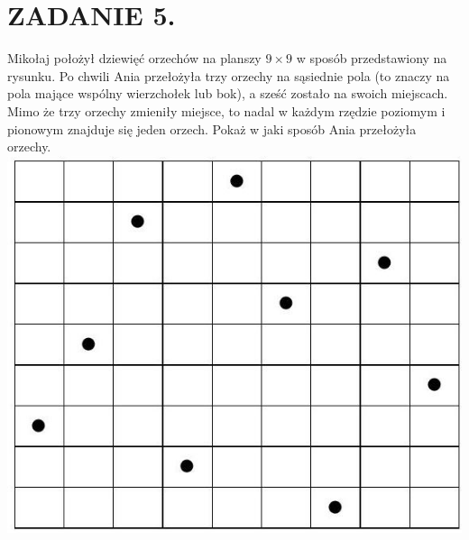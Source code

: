 \documentclass[10pt]{article}
\begin{document}
\section*{ZADANIE 5.}
Mikołaj położył dziewięć orzechów na planszy \(9 \times 9\) w sposób przedstawiony na rysunku. Po chwili Ania przełożyła trzy orzechy na sąsiednie pola (to znaczy na pola mające wspólny wierzchołek lub bok), a sześć zostało na swoich miejscach. Mimo że trzy orzechy zmieniły miejsce, to nadal w każdym rzędzie poziomym i pionowym znajduje się jeden orzech. Pokaż w jaki sposób Ania przełożyła orzechy.\\
\includegraphics[max width=\textwidth, center]{2024_11_21_1d80345ac4b2b7e80bbfg-1}
\end{document}
